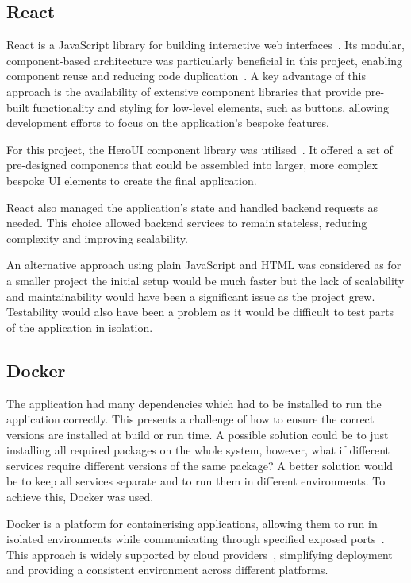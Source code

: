 \subsection{React}
React is a JavaScript library for building interactive web interfaces~\cite{React}. Its modular, component-based architecture was particularly beneficial in this project, enabling component reuse and reducing code duplication~\cite{10638895}. A key advantage of this approach is the availability of extensive component libraries that provide pre-built functionality and styling for low-level elements, such as buttons, allowing development efforts to focus on the application's bespoke features.

For this project, the HeroUI component library was utilised~\cite{HeroUI}. It offered a set of pre-designed components that could be assembled into larger, more complex bespoke UI elements to create the final application.

React also managed the application's state and handled backend requests as needed. This choice allowed backend services to remain stateless, reducing complexity and improving scalability.

An alternative approach using plain JavaScript and HTML was considered as for a smaller project the initial setup would be much faster but the lack of scalability and maintainability would have been a significant issue as the project grew. Testability would also have been a problem as it would be difficult to test parts of the application in isolation.

\subsection{Docker}
The application had many dependencies which had to be installed to run the application correctly. This presents a challenge of how to ensure the correct versions are installed at build or run time. A possible solution could be to just installing all required packages on the whole system, however, what if different services require different versions of the same package? A better solution would be to keep all services separate and to run them in different environments. To achieve this, Docker was used.

Docker is a platform for containerising applications, allowing them to run in isolated environments while communicating through specified exposed ports~\cite{DockerDocs}. This approach is widely supported by cloud providers~\cite{AWSDocker,GoogleDocker}, simplifying deployment and providing a consistent environment across different platforms.

